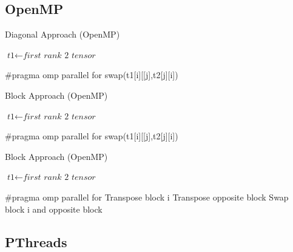 \documentclass[journal,10pt]{IEEEtran}
\begin{document}
\clearpage

\subsection*{OpenMP}
\begin{algorithm}
\caption{Diagonal Approach (OpenMP)}\label{euclid}
\begin{algorithmic}[1]
\State $\textit{t1} \gets \textit{first rank 2 tensor}$

\State 	\#pragma omp parallel for
\State swap(t1[i][[j],t2[j][i])
\EndFor
\EndFor



\EndProcedure
\end{algorithmic}
\end{algorithm}



\begin{algorithm}
\caption{Block Approach (OpenMP)}\label{euclid}
\begin{algorithmic}[1]
\State $\textit{t1} \gets \textit{first rank 2 tensor}$

\State \#pragma omp parallel for
\State swap(t1[i][[j],t2[j][i])
\EndFor
\EndFor



\EndProcedure
\end{algorithmic}
\end{algorithm}



\begin{algorithm}
\caption{Block Approach (OpenMP)}\label{euclid}
\begin{algorithmic}[1]
\State $\textit{t1} \gets \textit{first rank 2 tensor}$

\#pragma omp parallel for
\State Transpose block i
\State Transpose opposite block
\State Swap block i and opposite block
\EndFor



\EndProcedure
\end{algorithmic}
\end{algorithm}
\clearpage
\subsection*{PThreads}
\end{document}
